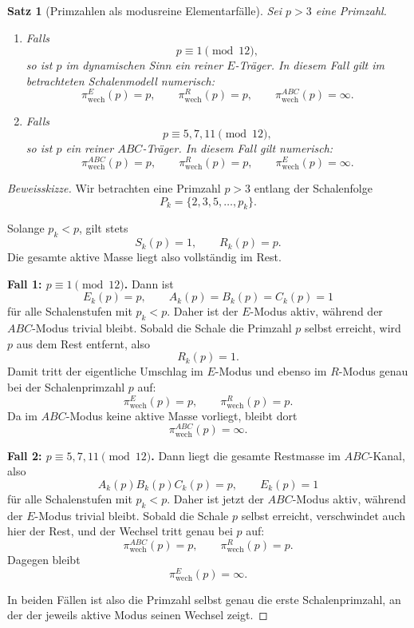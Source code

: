 \documentclass[11pt,a4paper]{article}
\newtheorem{satz}{Satz}
\theoremstyle{definition}
\theoremstyle{remark}
\begin{document}
	\begin{satz}[Primzahlen als modusreine Elementarfälle]
		\label{prop:primzahlfall}
		Sei \(p>3\) eine Primzahl.
		
		\begin{enumerate}
			\item Falls
			\[
			p\equiv 1\pmod{12},
			\]
			so ist \(p\) im dynamischen Sinn ein reiner \(E\)-Träger. In diesem Fall gilt
			im betrachteten Schalenmodell numerisch:
			\[
			\pi_{\mathrm{wech}}^{E}(p)=p,\qquad
			\pi_{\mathrm{wech}}^{R}(p)=p,\qquad
			\pi_{\mathrm{wech}}^{ABC}(p)=\infty.
			\]
			
			\item Falls
			\[
			p\equiv 5,7,11\pmod{12},
			\]
			so ist \(p\) ein reiner \(ABC\)-Träger. In diesem Fall gilt numerisch:
			\[
			\pi_{\mathrm{wech}}^{ABC}(p)=p,\qquad
			\pi_{\mathrm{wech}}^{R}(p)=p,\qquad
			\pi_{\mathrm{wech}}^{E}(p)=\infty.
			\]
		\end{enumerate}
	\end{satz}
	
	\begin{proof}[Beweisskizze]
		Wir betrachten eine Primzahl \(p>3\) entlang der Schalenfolge
		\[
		P_k=\{2,3,5,\dots,p_k\}.
		\]
		
		Solange \(p_k<p\), gilt stets
		\[
		S_k(p)=1,\qquad R_k(p)=p.
		\]
		Die gesamte aktive Masse liegt also vollständig im Rest.
		
		\medskip
		\noindent
		\textbf{Fall 1: \(p\equiv 1\pmod{12}\).}
		Dann ist
		\[
		E_k(p)=p,\qquad A_k(p)=B_k(p)=C_k(p)=1
		\]
		für alle Schalenstufen mit \(p_k<p\). Daher ist der \(E\)-Modus aktiv, während
		der \(ABC\)-Modus trivial bleibt. Sobald die Schale die Primzahl \(p\) selbst erreicht,
		wird \(p\) aus dem Rest entfernt, also
		\[
		R_k(p)=1.
		\]
		Damit tritt der eigentliche Umschlag im \(E\)-Modus und ebenso im \(R\)-Modus
		genau bei der Schalenprimzahl \(p\) auf:
		\[
		\pi_{\mathrm{wech}}^{E}(p)=p,\qquad \pi_{\mathrm{wech}}^{R}(p)=p.
		\]
		Da im \(ABC\)-Modus keine aktive Masse vorliegt, bleibt dort
		\[
		\pi_{\mathrm{wech}}^{ABC}(p)=\infty.
		\]
		
		\medskip
		\noindent
		\textbf{Fall 2: \(p\equiv 5,7,11\pmod{12}\).}
		Dann liegt die gesamte Restmasse im \(ABC\)-Kanal, also
		\[
		A_k(p)B_k(p)C_k(p)=p,\qquad E_k(p)=1
		\]
		für alle Schalenstufen mit \(p_k<p\). Daher ist jetzt der \(ABC\)-Modus aktiv,
		während der \(E\)-Modus trivial bleibt. Sobald die Schale \(p\) selbst erreicht,
		verschwindet auch hier der Rest, und der Wechsel tritt genau bei \(p\) auf:
		\[
		\pi_{\mathrm{wech}}^{ABC}(p)=p,\qquad \pi_{\mathrm{wech}}^{R}(p)=p.
		\]
		Dagegen bleibt
		\[
		\pi_{\mathrm{wech}}^{E}(p)=\infty.
		\]
		
		In beiden Fällen ist also die Primzahl selbst genau die erste Schalenprimzahl,
		an der der jeweils aktive Modus seinen Wechsel zeigt.
	\end{proof}
	
\end{document}
